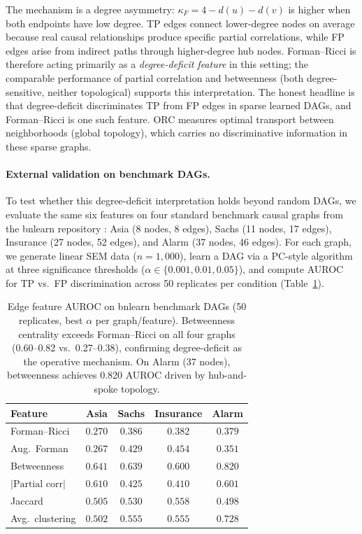 \documentclass{article}
\begin{document}
The mechanism is a degree asymmetry: $\kappa_F = 4 - d(u) - d(v)$ is higher when both endpoints have low degree.
TP edges connect lower-degree nodes on average because real causal relationships produce specific partial correlations, while FP edges arise from indirect paths through higher-degree hub nodes.
Forman--Ricci is therefore acting primarily as a \emph{degree-deficit feature} in this setting; the comparable performance of partial correlation and betweenness (both degree-sensitive, neither topological) supports this interpretation.
The honest headline is that degree-deficit discriminates TP from FP edges in sparse learned DAGs, and Forman--Ricci is one such feature.
ORC measures optimal transport between neighborhoods (global topology), which carries no discriminative information in these sparse graphs.

\paragraph{External validation on benchmark DAGs.}
To test whether this degree-deficit interpretation holds beyond random DAGs, we evaluate the same six features on four standard benchmark causal graphs from the bnlearn repository \citep{scutari2010learning}: Asia (8 nodes, 8 edges), Sachs (11 nodes, 17 edges), Insurance (27 nodes, 52 edges), and Alarm (37 nodes, 46 edges). For each graph, we generate linear SEM data ($n = 1{,}000$), learn a DAG via a PC-style algorithm at three significance thresholds ($\alpha \in \{0.001, 0.01, 0.05\}$), and compute AUROC for TP vs.\ FP discrimination across 50 replicates per condition (Table~\ref{tab:bnlearn}).

\begin{table}[t]
\centering
\caption{Edge feature AUROC on bnlearn benchmark DAGs (50 replicates, best $\alpha$ per graph/feature). Betweenness centrality exceeds Forman--Ricci on all four graphs (0.60--0.82 vs.\ 0.27--0.38), confirming degree-deficit as the operative mechanism. On Alarm (37 nodes), betweenness achieves 0.820 AUROC driven by hub-and-spoke topology.}
\label{tab:bnlearn}
\small
\begin{tabular}{@{}lcccc@{}}
\toprule
\textbf{Feature} & \textbf{Asia} & \textbf{Sachs} & \textbf{Insurance} & \textbf{Alarm} \\
\midrule
Forman--Ricci & $0.270$ & $0.386$ & $0.382$ & $0.379$ \\
Aug.\ Forman & $0.267$ & $0.429$ & $0.454$ & $0.351$ \\
Betweenness & $\mathbf{0.641}$ & $\mathbf{0.639}$ & $\mathbf{0.600}$ & $\mathbf{0.820}$ \\
$|\text{Partial corr}|$ & $0.610$ & $0.425$ & $0.410$ & $0.601$ \\
Jaccard & $0.505$ & $0.530$ & $0.558$ & $0.498$ \\
Avg.\ clustering & $0.502$ & $0.555$ & $0.555$ & $0.728$ \\
\bottomrule
\end{tabular}
\end{table}
\end{document}

